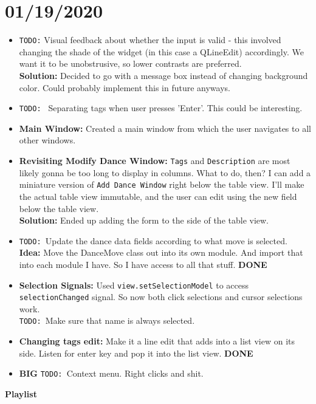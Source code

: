 \documentclass{article}
\begin{document}
\section{01/19/2020}
\begin{itemize}
	\item \texttt{TODO:} Visual feedback about whether the input is valid - this involved changing the shade of the widget (in this case a QLineEdit) accordingly. We want it to be unobstrusive, so lower contrasts are preferred.\\
	\textbf{Solution: }Decided to go with a message box instead of changing background color. Could probably implement this in future anyways.
	\item \texttt{TODO: } Separating tags when user presses 'Enter'. This could be interesting. 
	\item \textbf{Main Window: }Created a main window from which the user navigates to all other windows.  
	\item \textbf{Revisiting Modify Dance Window: }\texttt{Tags} and \texttt{Description} are most likely gonna be too long to display in columns. What to do, then? I can add a miniature version of \texttt{Add Dance Window} right below the table view. I'll make the actual table view immutable, and the user can edit using the new field below the table view.\\
	\textbf{Solution: }Ended up adding the form to the side of the table view.  
	\item \texttt{TODO: }Update the dance data fields according to what move is selected. \textbf{Idea: }Move the DanceMove class out into its own module. And import that into each module I have. So I have access to all that stuff. \textbf{DONE}
	\item \textbf{Selection Signals: }Used \texttt{view.setSelectionModel} to access \texttt{selectionChanged} signal. So now both click selections and cursor selections work. \\
	\texttt{TODO: }Make sure that name is always selected.
	\item \textbf{Changing tags edit: }Make it a line edit that adds into a list view on its side. Listen for enter key and pop it into the list view. \textbf{DONE}
	\item \textbf{BIG }\texttt{TODO: }Context menu. Right clicks and shit.
\end{itemize}
\textbf{Playlist}
\end{document}
